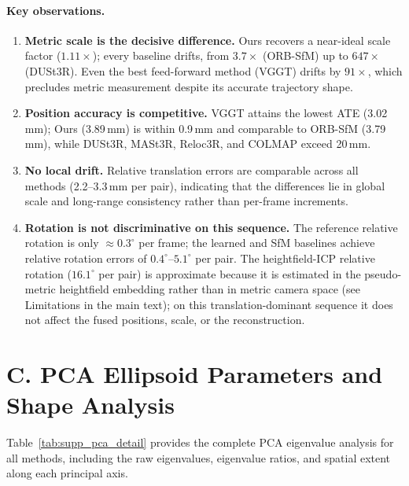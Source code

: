 \documentclass[review]{elsarticle}
\begin{document}
\paragraph{Key observations.}
\begin{enumerate}[noitemsep]
    \item \textbf{Metric scale is the decisive difference.} Ours recovers a near-ideal scale factor ($1.11{\times}$); every baseline drifts, from $3.7{\times}$ (ORB-SfM) up to $647{\times}$ (DUSt3R). Even the best feed-forward method (VGGT) drifts by $91{\times}$, which precludes metric measurement despite its accurate trajectory shape.
    \item \textbf{Position accuracy is competitive.} VGGT attains the lowest ATE (3.02\,mm); Ours (3.89\,mm) is within 0.9\,mm and comparable to ORB-SfM (3.79\,mm), while DUSt3R, MASt3R, Reloc3R, and COLMAP exceed 20\,mm.
    \item \textbf{No local drift.} Relative translation errors are comparable across all methods (2.2--3.3\,mm per pair), indicating that the differences lie in global scale and long-range consistency rather than per-frame increments.
    \item \textbf{Rotation is not discriminative on this sequence.} The reference relative rotation is only ${\approx}0.3^{\circ}$ per frame; the learned and SfM baselines achieve relative rotation errors of $0.4^{\circ}$--$5.1^{\circ}$ per pair. The heightfield-ICP relative rotation ($16.1^{\circ}$ per pair) is approximate because it is estimated in the pseudo-metric heightfield embedding rather than in metric camera space (see Limitations in the main text); on this translation-dominant sequence it does not affect the fused positions, scale, or the reconstruction.
\end{enumerate}

\section*{C. PCA Ellipsoid Parameters and Shape Analysis}

Table~\ref{tab:supp_pca_detail} provides the complete PCA eigenvalue analysis for all methods, including the raw eigenvalues, eigenvalue ratios, and spatial extent along each principal axis.
\end{document}
